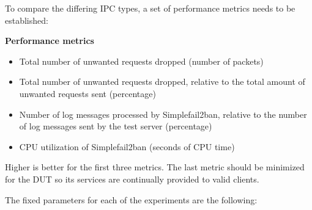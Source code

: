 \noindent
To compare the differing \ac{IPC} types, a set of performance metrics needs to be established:

\bigskip
\noindent
\textbf{Performance metrics}
\begin{itemize}
    \item Total number of unwanted requests dropped (number of packets)
    \item Total number of unwanted requests dropped, relative to the total amount of unwanted requests sent (percentage)
    \item Number of log messages processed by Simplefail2ban, relative to the number of log messages sent by the test server (percentage)
    \item \ac{CPU} utilization of Simplefail2ban (seconds of \ac{CPU} time)
\end{itemize}
Higher is better for the first three metrics.
The last metric should be minimized for the \ac{DUT} so its services are continually provided to valid clients.

\bigskip
\noindent
The fixed parameters for each of the experiments are the following\@:

